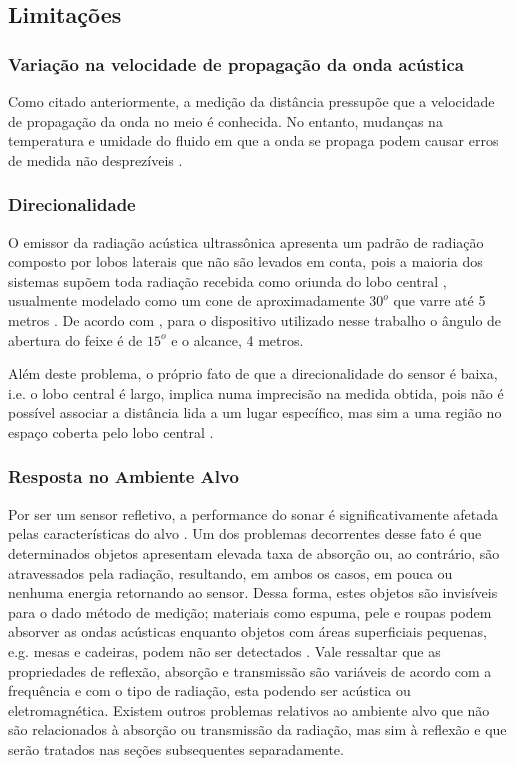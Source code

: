 \subsection{Limitações}

\subsubsection{Variação na velocidade de propagação da onda acústica}
Como citado anteriormente, a medição da distância pressupõe que a velocidade de propagação da onda no meio é conhecida. 
No entanto, mudanças na temperatura e umidade do fluido em que a onda se propaga podem causar erros de medida não desprezíveis \cite{everett}.

\subsubsection{Direcionalidade}
O emissor da radiação acústica ultrassônica apresenta um padrão de radiação \cite{balanis,pozar} composto por lobos laterais \cite{balanis,pozar} que 
não são levados em conta, pois a maioria dos sistemas supõem toda radiação recebida como oriunda do lobo central \cite{balanis,pozar}, usualmente 
modelado como um cone de aproximadamente $30^o$ que varre até 5 metros \cite{murphy}. De acordo com , para o dispositivo 
utilizado nesse trabalho o ângulo de abertura do feixe é de $15^o$ e o alcance, 4 metros.

Além deste problema, o próprio fato de que a direcionalidade do sensor é baixa, i.e. o lobo central é largo, implica numa 
imprecisão na medida obtida, pois não é possível associar a distância lida a um lugar específico, mas sim a uma região no espaço coberta pelo lobo 
central \cite{siegwart}.

\subsubsection{Resposta no Ambiente Alvo}
Por ser um sensor refletivo, a performance do sonar é significativamente afetada pelas características do alvo \cite{everett}.
Um dos problemas decorrentes desse fato é que determinados objetos apresentam elevada taxa de absorção ou, ao contrário, são atravessados pela 
radiação, resultando, em ambos os casos, em pouca ou nenhuma energia retornando ao sensor. Dessa forma, estes objetos são invisíveis para o dado 
método de medição; materiais como espuma, pele e roupas podem absorver as ondas acústicas \cite{siegwart} enquanto objetos com áreas superficiais 
pequenas, e.g. mesas e cadeiras, podem não ser detectados \cite{murphy}. Vale ressaltar que as propriedades de reflexão, absorção e transmissão 
são variáveis de acordo com a frequência e com o tipo de radiação, esta podendo ser acústica ou eletromagnética.
Existem outros problemas relativos ao ambiente alvo que não são relacionados à absorção ou transmissão da radiação, mas sim à reflexão e que serão 
tratados nas 
seções subsequentes separadamente.

